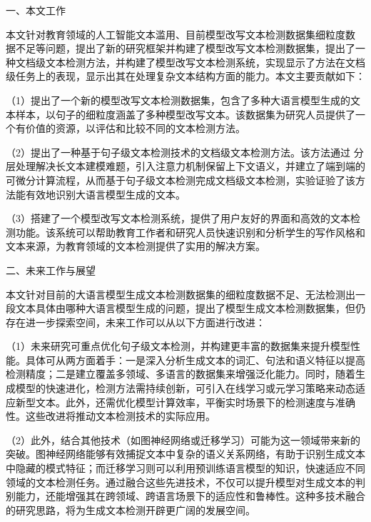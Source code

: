 %
%
%
%

\begin{conclusion}

一、本文工作

本文针对教育领域的人工智能文本滥用、目前模型改写文本检测数据集细粒度数
据不足等问题，提出了新的研究框架并构建了模型改写文本检测数据集，提出了一种文档级文本检测方法，并构建了模型改写文本检测系统，实现显示了方法在文档级任务上的表现，显示出其在处理复杂文本结构方面的能力。本文主要贡献如下：

（1）提出了一个新的模型改写文本检测数据集，包含了多种大语言模型生成的文本样本，以句子的细粒度涵盖了多种模型改写文本。该数据集为研究人员提供了一个有价值的资源，以评估和比较不同的文本检测方法。

（2）提出了一种基于句子级文本检测技术的文档级文本检测方法。该方法通过
分层处理解决长文本建模难题，引入注意力机制保留上下文语义，并建立了端到端的可微分计算流程，从而基于句子级文本检测完成文档级文本检测，实验证验了该方法能有效地识别大语言模型生成的文本。

（3）搭建了一个模型改写文本检测系统，提供了用户友好的界面和高效的文本检测功能。该系统可以帮助教育工作者和研究人员快速识别和分析学生的写作风格和文本来源，为教育领域的文本检测提供了实用的解决方案。

二、未来工作与展望

本文针对目前的大语言模型生成文本检测数据集的细粒度数据不足、无法检测出一段文本具体由哪种大语言模型生成的问题，提出了模型生成文本检测数据集，但仍存在进一步探索空间，未来工作可以从以下方面进行改进：

（1）未来研究可重点优化句子级文本检测，并构建更丰富的数据集来提升模型性能。具体可从两方面着手：一是深入分析生成文本的词汇、句法和语义特征以提高检测精度；二是建立覆盖多领域、多语言的数据集来增强泛化能力。同时，随着生成模型的快速进化，检测方法需持续创新，可引入在线学习或元学习策略来动态适应新型文本。此外，还需优化模型计算效率，平衡实时场景下的检测速度与准确性。这些改进将推动文本检测技术的实际应用。

（2）此外，结合其他技术（如图神经网络或迁移学习）可能为这一领域带来新的突破。图神经网络能够有效捕捉文本中复杂的语义关系网络，有助于识别生成文本中隐藏的模式特征；而迁移学习则可以利用预训练语言模型的知识，快速适应不同领域的文本检测任务。通过融合这些先进技术，不仅可以提升模型对生成文本的判别能力，还能增强其在跨领域、跨语言场景下的适应性和鲁棒性。这种多技术融合的研究思路，将为生成文本检测开辟更广阔的发展空间。


\end{conclusion}
